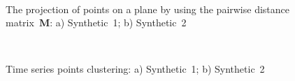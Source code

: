 \documentclass[12pt, twoside]{article}
\numberwithin{equation}{section}
\begin{document}
\begin{figure}[h!t]\center
{}
\\
\caption{The projection of points on a plane by using the pairwise distance matrix~$\textbf{M}$: a) Synthetic~1; b) Synthetic~2}
\label{fig_synthetic_2D}
\end{figure}

\begin{figure}[h!t]\center
{}
\\
\caption{Time series points clustering: a) Synthetic~1; b) Synthetic~2}
\label{fig_synthetic_claster}
\end{figure}
\end{document}
